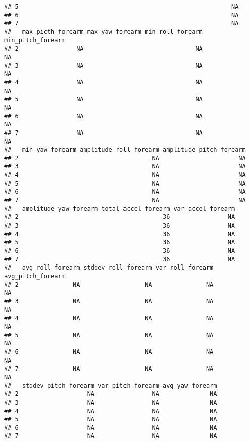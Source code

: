\documentclass[]{article}
\begin{document}
\begin{verbatim}
## 5                                                           NA
## 6                                                           NA
## 7                                                           NA
##   max_picth_forearm max_yaw_forearm min_roll_forearm min_pitch_forearm
## 2                NA                               NA                NA
## 3                NA                               NA                NA
## 4                NA                               NA                NA
## 5                NA                               NA                NA
## 6                NA                               NA                NA
## 7                NA                               NA                NA
##   min_yaw_forearm amplitude_roll_forearm amplitude_pitch_forearm
## 2                                     NA                      NA
## 3                                     NA                      NA
## 4                                     NA                      NA
## 5                                     NA                      NA
## 6                                     NA                      NA
## 7                                     NA                      NA
##   amplitude_yaw_forearm total_accel_forearm var_accel_forearm
## 2                                        36                NA
## 3                                        36                NA
## 4                                        36                NA
## 5                                        36                NA
## 6                                        36                NA
## 7                                        36                NA
##   avg_roll_forearm stddev_roll_forearm var_roll_forearm avg_pitch_forearm
## 2               NA                  NA               NA                NA
## 3               NA                  NA               NA                NA
## 4               NA                  NA               NA                NA
## 5               NA                  NA               NA                NA
## 6               NA                  NA               NA                NA
## 7               NA                  NA               NA                NA
##   stddev_pitch_forearm var_pitch_forearm avg_yaw_forearm
## 2                   NA                NA              NA
## 3                   NA                NA              NA
## 4                   NA                NA              NA
## 5                   NA                NA              NA
## 6                   NA                NA              NA
## 7                   NA                NA              NA

\end{verbatim}
\end{document}
